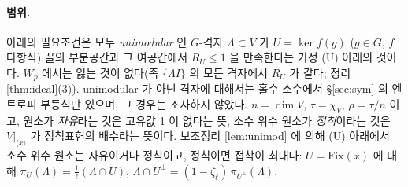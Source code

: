 \paragraph{범위.} 아래의 필요조건은 모두 \emph{unimodular} 인 $G$-격자 $\Lambda\subset V$ 가 $U=\ker f(g)$ ($g\in G$, $f$ 다항식) 꼴의 부분공간과 그 여공간에서 $R_U\le1$ 을 만족한다는 가정 (U) 아래의 것이다. $W_p$ 에서는 잃는 것이 없다(족 $\{\Lambda I\}$ 의 모든 격자에서 $R_U$ 가 같다; 정리 \ref{thm:ideal}(3)). unimodular 가 아닌 격자에 대해서는 홀수 소수에서 \S\ref{sec:sym} 의 엔트로피 부등식만 있으며, 그 경우는 조사하지 않았다. $n=\dim V$, $\tau=\chi_V$, $\rho=\tau/n$ 이고, 원소가 \emph{자유}라는 것은 고유값 1 이 없다는 뜻, 소수 위수 원소가 \emph{정칙}이라는 것은 $V|_{\langle x\rangle}$ 가 정칙표현의 배수라는 뜻이다. 보조정리 \ref{lem:unimod} 에 의해 (U) 아래에서 소수 위수 원소는 자유이거나 정칙이고, 정칙이면 접착이 최대다: $U=\mathrm{Fix}(x)$ 에 대해 $\pi_U(\Lambda)=\tfrac1\ell(\Lambda\cap U)$, $\Lambda\cap U^\perp=(1-\zeta_\ell)\,\pi_{U^\perp}(\Lambda)$.

